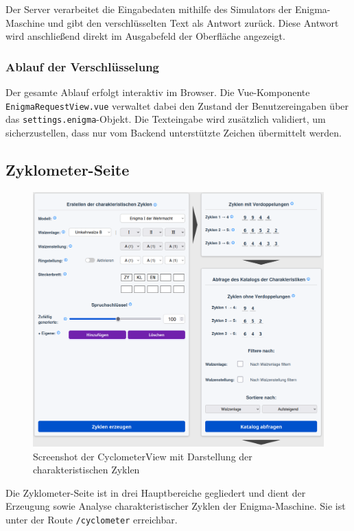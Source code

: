 \documentclass[12pt, ngerman, a4paper, numbers=noenddot]{article}
\begin{document}
Der Server verarbeitet die Eingabedaten mithilfe des Simulators der Enigma-Maschine und gibt den verschlüsselten Text als Antwort zurück. Diese Antwort wird anschließend direkt im Ausgabefeld der Oberfläche angezeigt.

\subsubsection{Ablauf der Verschlüsselung}

Der gesamte Ablauf erfolgt interaktiv im Browser. Die Vue-Komponente \newline \lstinline|EnigmaRequestView.vue| verwaltet dabei den Zustand der Benutzereingaben über das \lstinline|settings.enigma|-Objekt. Die Texteingabe wird zusätzlich validiert, um sicherzustellen, dass nur vom Backend unterstützte Zeichen übermittelt werden.

\subsection{Zyklometer-Seite}
\begin{figure}[H]
	\centering
	\includegraphics[width=1\textwidth]{bilder/CyclometerView_Cyclometer.png}
	\caption{Screenshot der CyclometerView mit Darstellung der charakteristischen Zyklen}
	\label{fig:CyclometerView_Cyclometer}
\end{figure}


Die Zyklometer-Seite ist in drei Hauptbereiche gegliedert und dient der Erzeugung sowie Analyse charakteristischer Zyklen der Enigma-Maschine. Sie ist unter der Route \lstinline|/cyclometer| erreichbar.
\end{document}
